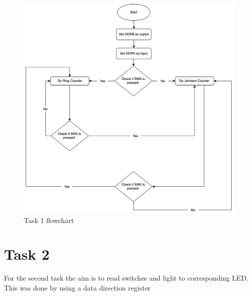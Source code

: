 \documentclass[a4paper,12pt]{article}
\begin{document}
\begin{figure}
\begin{center}
\includegraphics[width=\textwidth/1 ]{flowchart/task1_flowchart.png}
\end{center}
\caption{Task 1 flowchart}
\label{task1}
\end{figure}
\break


\section{Task 2}
For the second task the aim is to read switches and light to corresponding LED. This was done by using a data direction register 
\lstset{style=Asm}
\end{document}
